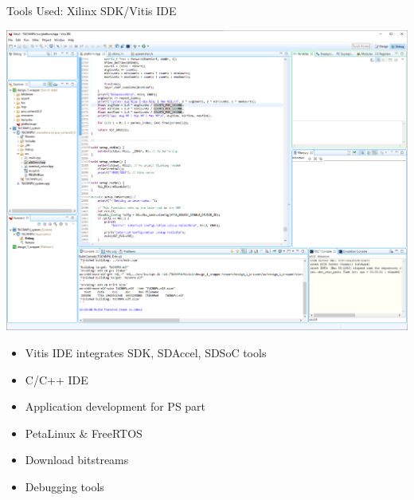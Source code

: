 \begin{frame}{Tools Used: Xilinx SDK/Vitis IDE}
	\begin{minipage}{0.6\textwidth}
		\centering
		\includegraphics[width=\textwidth]{../Images/Platform/Vitis-IDE.png}\\
	\end{minipage}%
	\begin{minipage}{0.4\textwidth}
		\begin{itemize}
			\item Vitis IDE  integrates SDK, SDAccel, SDSoC tools
			\item C/C++ IDE
			\item Application development for PS part
			\item PetaLinux \& FreeRTOS
			\item Download bitstreams
			\item Debugging tools
		\end{itemize}
	\end{minipage}
\end{frame}
